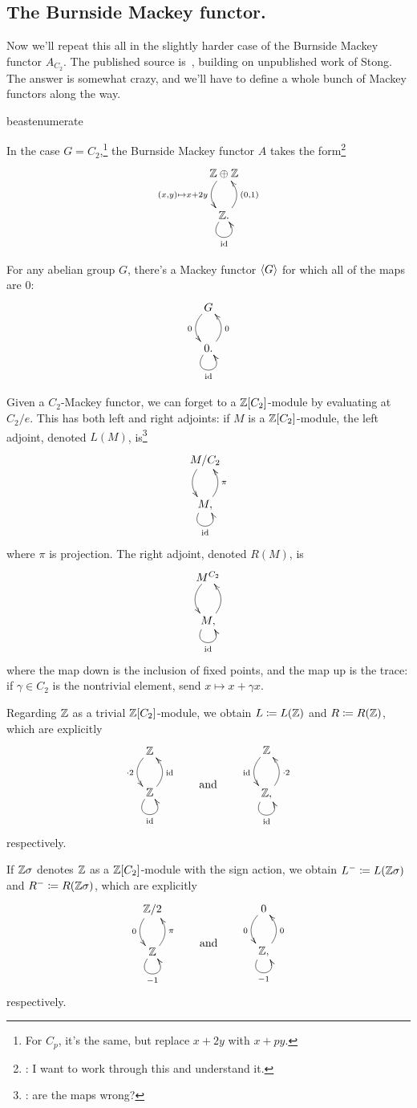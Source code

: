 \subsection*{The Burnside Mackey functor.}
Now we'll repeat this all in the slightly harder case of the Burnside Mackey functor $A_{C_2}$. The published
source is~\cite{Lew88}, building on unpublished work of Stong. The answer is somewhat crazy, and we'll have to
define a whole bunch of Mackey functors along the way.
\begin{comp}{beast}{enumerate}
	\item In the case $G = C_2$,\footnote{For $C_p$, it's the same, but replace $x+2y$ with $x+py$.} the Burnside
	Mackey functor $A$ takes the form\footnote{\TODO: I want to work through this and understand it.}
	\[\xymatrix{
		\Z\oplus\Z\ar@/_0.4cm/[d]_{(x,y)\mapsto x+2y}\\
		\Z.\ar@(dl,dr)_\id\ar@/_0.4cm/[u]_{(0,1)}
	}\]
	\item For any abelian group $G$, there's a Mackey functor $\langle G\rangle$ for which all of the maps are $0$:
	\[\xymatrix{
		G\ar@/_0.4cm/[d]_0\\
		0.\ar@(dl,dr)_\id\ar@/_0.4cm/[u]_0
	}\]
	\item Given a $C_2$-Mackey functor, we can forget to a $\mathbb Z[C_2]$-module by evaluating at $C_2/e$. This has
	both left and right adjoints: if $M$ is a $\mathbb Z[C_2]$-module, the left adjoint, denoted $L(M)$, is\footnote{\TODO:
	are the maps wrong?}
	\[\xymatrix{
		M/C_2\ar@/_0.4cm/[d]\\
		M,\ar@(dl,dr)_\id\ar@/_0.4cm/[u]_\pi
	}\]
	where $\pi$ is projection. The right adjoint, denoted $R(M)$, is
	\[\xymatrix{
		M^{C_2}\ar@/_0.4cm/[d]\\
		M,\ar@(dl,dr)_\id\ar@/_0.4cm/[u]
	}\]
	where the map down is the inclusion of fixed points, and the map up is the trace: if $\gamma\in C_2$ is the
	nontrivial element, send $x\mapsto x+\gamma x$.
	\item Regarding $\mathbb Z$ as a trivial $\mathbb Z[C_2]$-module, we obtain $L\coloneqq L(\mathbb Z)$ and $R\coloneqq R(\mathbb Z)$, which
	are explicitly
	\[\gathxy{
		\Z\ar@/_0.4cm/[d]_{\cdot 2}\\
		\Z\ar@(dl,dr)_\id\ar@/_0.4cm/[u]_\id
	}\qquad\text{and}\qquad
	\gathxy{
		\Z\ar@/_0.4cm/[d]_\id\\
		\Z,\ar@(dl,dr)_\id\ar@/_0.4cm/[u]_{\cdot 2}
	}
	\]
	respectively.
	\item If $\mathbb Z\sigma$ denotes $\mathbb Z$ as a $\mathbb Z[C_2]$-module with the sign action, we obtain $L^-\coloneqq
	L(\mathbb Z\sigma)$ and $R^-\coloneqq R(\mathbb Z\sigma)$, which are explicitly
	\[\gathxy{
		\Z/2\ar@/_0.4cm/[d]_0\\
		\Z\ar@(dl,dr)_{-1}\ar@/_0.4cm/[u]_\pi
	}\qquad\text{and}\qquad
	\gathxy{
		0\ar@/_0.4cm/[d]_0\\
		\Z,\ar@(dl,dr)_{-1}\ar@/_0.4cm/[u]_0
	}
	\]
	respectively.
\end{comp}

